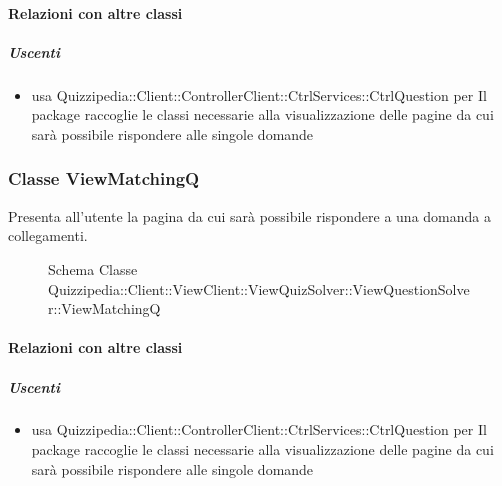 \paragraph{Relazioni con altre classi}
\subparagraph{Uscenti}
\begin{itemize}
\item usa Quizzipedia::Client::ControllerClient::CtrlServices::CtrlQuestion per Il package raccoglie le classi necessarie alla visualizzazione delle pagine da cui sarà possibile rispondere alle singole domande
\end{itemize}
\subsubsection{Classe ViewMatchingQ}
Presenta all'utente la pagina da cui sarà possibile rispondere a una domanda a collegamenti.
\begin{figure}[H]
\centering
\noindent{}
\caption[Schema Classe ViewMatchingQ]{Schema Classe Quizzipedia::Client::ViewClient::ViewQuizSolver::ViewQuestionSolver::ViewMatchingQ}
\end{figure}
\paragraph{Relazioni con altre classi}
\subparagraph{Uscenti}
\begin{itemize}
\item usa Quizzipedia::Client::ControllerClient::CtrlServices::CtrlQuestion per Il package raccoglie le classi necessarie alla visualizzazione delle pagine da cui sarà possibile rispondere alle singole domande
\end{itemize}
